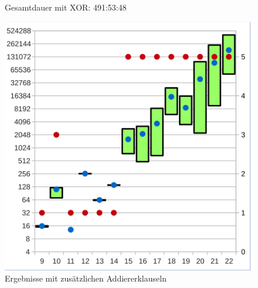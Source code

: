 \begin{figure}[!h]
\begin{minipage}[c]{0.45\textwidth}
  \begin{flushleft}Gesamtdauer mit XOR: 491:53:48\end{flushleft}
  \includegraphics[scale=0.55]{images/data_add_xor}
  \end{minipage}
  \caption{Ergebnisse mit zusätzlichen Addiererklauseln}
  \label{fig:data_add}
\end{figure}